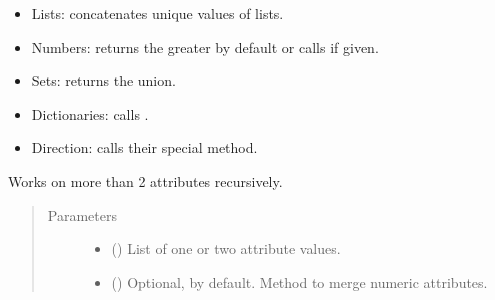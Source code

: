 \documentclass[letterpaper,10pt,english]{sphinxmanual}
\begin{document}
\begin{fulllineitems}
\begin{fulllineitems}
\begin{itemize}
\item {} 
Lists: concatenates unique values of lists.

\item {} 
Numbers: returns the greater by default or calls
 if given.

\item {} 
Sets: returns the union.

\item {} 
Dictionaries: calls .

\item {} 
Direction: calls their special
{\hyperref[\detokenize{main:pypath.main.Direction.merge}]{}} method.

\end{itemize}

Works on more than 2 attributes recursively.
\begin{quote}\begin{description}
\item[{Parameters}] \leavevmode\begin{itemize}
\item {} 
 () \textendash{} List of one or two attribute values.

\item {} 
 () \textendash{} Optional,  by default. Method to merge numeric
attributes.

\end{itemize}

\end{description}\end{quote}

\end{fulllineitems}


\begin{fulllineitems}
\label{\detokenize{main:pypath.main.PyPath.communities}}
\end{fulllineitems}



\end{fulllineitems}
\end{document}

